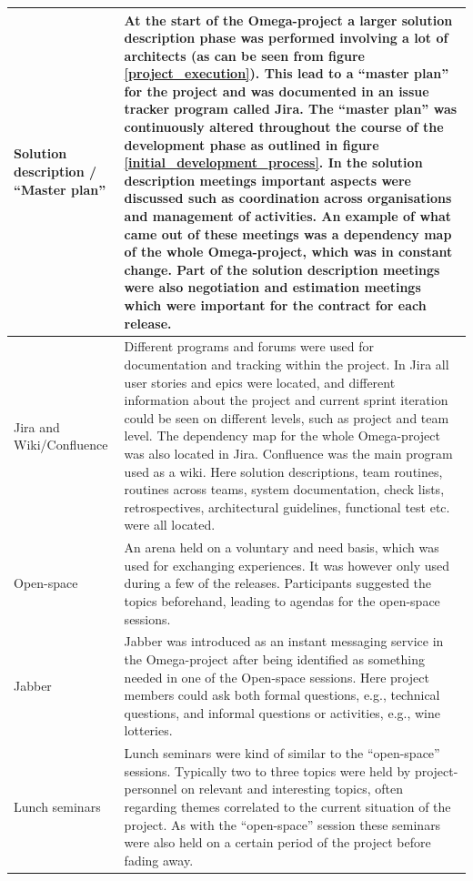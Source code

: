 \begin{center}
\begin{longtable}{| p{3.5cm} | p{8cm} |}
    Solution description / ``Master plan'' & At the start of the Omega-project a larger solution description phase was performed involving a lot of architects (as can be seen from figure \ref{project_execution}). This lead to a ``master plan'' for the project and was documented in an issue tracker program called Jira. The ``master plan'' was continuously altered throughout the course of the development phase as outlined in figure \ref{initial_development_process}. In the solution description meetings important aspects were discussed such as coordination across organisations and management of activities. An example of what came out of these meetings was a dependency map of the whole Omega-project, which was in constant change. Part of the solution description meetings were also negotiation and estimation meetings which were important for the contract for each release. \\ \hline
    Jira and Wiki/Confluence & Different programs and forums were used for documentation and tracking within the project. In Jira all user stories and epics were located, and different information about the project and current sprint iteration could be seen on different levels, such as project and team level. The dependency map for the whole Omega-project was also located in Jira. Confluence was the main program used as a wiki. Here solution descriptions, team routines, routines across teams, system documentation, check lists, retrospectives, architectural guidelines, functional test etc. were all located. \\ \hline
    Open-space & An arena held on a voluntary and need basis, which was used for exchanging experiences. It was however only used during a few of the releases. Participants suggested the topics beforehand, leading to agendas for the open-space sessions. \\ \hline
    Jabber & Jabber was introduced as an instant messaging service in the Omega-project after being identified as something needed in one of the Open-space sessions. Here project members could ask both formal questions, e.g., technical questions, and informal questions or activities, e.g., wine lotteries. \\ \hline
    Lunch seminars & Lunch seminars were kind of similar to the ``open-space'' sessions. Typically two to three topics were held by project-personnel on relevant and interesting topics, often regarding themes correlated to the current situation of the project. As with the ``open-space'' session these seminars were also held on a certain period of the project before fading away. \\ \hline

\end{longtable}
\end{center}
